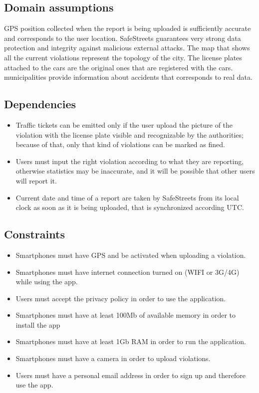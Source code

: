 \documentclass[../RASD.tex]{subfiles}
\begin{document}
    \subsection{Domain assumptions}\label{subsec:domain-assumpiton}
    \begin{enumerate}
         GPS position collected when the report is being uploaded is sufficiently accurate and corresponds to the user location.
         SafeStreets guarantees very strong data protection and integrity against malicious external attacks.
         The map that shows all the current violations represent the topology of the city.
         The license plates attached to the cars are the original ones that are registered with the cars.
         municipalities provide information about accidents that corresponds to real data.
    \end{enumerate}
    \subsection{Dependencies}\label{subsec:dependencies}
    \begin{itemize}
        \item Traffic tickets can be emitted only if the user upload the picture of the violation with the license plate visible and recognizable by the authorities; because of that, only that kind of violations can be marked as fined.
        \item Users must input the right violation according to what they are reporting, otherwise statistics may be inaccurate, and it will be possible that other users will report it.
        \item Current date and time of a report are taken by SafeStreets from its local clock as soon as it is being uploaded, that is synchronized according UTC.
    \end{itemize}
    \subsection{Constraints}\label{subsec:constraints}
    \begin{itemize}
        \item Smartphones must have GPS and be activated when uploading a violation.
        \item Smartphones must have internet connection turned on (WIFI or 3G/4G) while using the app.
        \item Users must accept the privacy policy in order to use the application.
        \item Smartphones must have at least 100Mb of available memory in order to install the app
        \item Smartphones must have at least 1Gb RAM in order to run the application.
        \item Smartphones must have a camera in order to upload violations.
        \item Users must have a personal email address in order to sign up and therefore use the app.
    \end{itemize}
\end{document}
